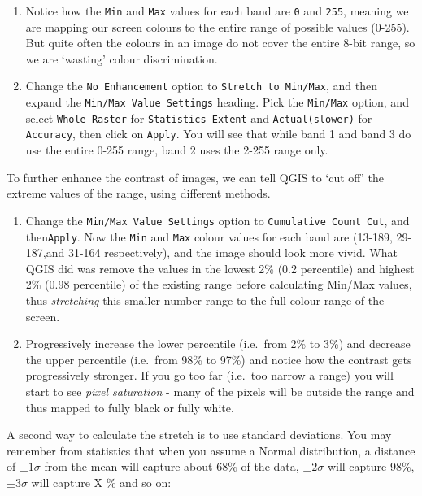 \documentclass[
  letterpaper,
  DIV=11,
  numbers=noendperiod]{scrreprt}
\begin{document}
\begin{enumerate}
\def\labelenumi{(\arabic{enumi})}
\setcounter{enumi}{182}
\item
  Notice how the \texttt{Min} and \texttt{Max} values for each band are
  \texttt{0} and \texttt{255}, meaning we are mapping our screen colours
  to the entire range of possible values (0-255). But quite often the
  colours in an image do not cover the entire 8-bit range, so we are
  `wasting' colour discrimination.
\item
  Change the \texttt{No\ Enhancement} option to
  \texttt{Stretch\ to\ Min/Max}, and then expand the
  \texttt{Min/Max\ Value\ Settings} heading. Pick the \texttt{Min/Max}
  option, and select \texttt{Whole\ Raster} for
  \texttt{Statistics\ Extent} and \texttt{Actual(slower)} for
  \texttt{Accuracy}, then click on \texttt{Apply}. You will see that
  while band 1 and band 3 do use the entire 0-255 range, band 2 uses the
  2-255 range only.
\end{enumerate}

To further enhance the contrast of images, we can tell QGIS to `cut off'
the extreme values of the range, using different methods.

\begin{enumerate}
\def\labelenumi{(\arabic{enumi})}
\setcounter{enumi}{184}
\item
  Change the \texttt{Min/Max\ Value\ Settings} option to
  \texttt{Cumulative\ Count\ Cut}, and then\texttt{Apply}. Now the
  \texttt{Min} and \texttt{Max} colour values for each band are (13-189,
  29-187,and 31-164 respectively), and the image should look more vivid.
  What QGIS did was remove the values in the lowest 2\% (0.2 percentile)
  and highest 2\% (0.98 percentile) of the existing range before
  calculating Min/Max values, thus \emph{stretching} this smaller number
  range to the full colour range of the screen.
\item
  Progressively increase the lower percentile (i.e.~from 2\% to 3\%) and
  decrease the upper percentile (i.e.~from 98\% to 97\%) and notice how
  the contrast gets progressively stronger. If you go too far (i.e.~too
  narrow a range) you will start to see \emph{pixel saturation} - many
  of the pixels will be outside the range and thus mapped to fully black
  or fully white.
\end{enumerate}

A second way to calculate the stretch is to use standard deviations. You
may remember from statistics that when you assume a Normal distribution,
a distance of \(\pm 1 \sigma\) from the mean will capture about 68\% of
the data, \(\pm 2 \sigma\) will capture 98\%, \(\pm 3 \sigma\) will
capture X \% and so on:
\end{document}
